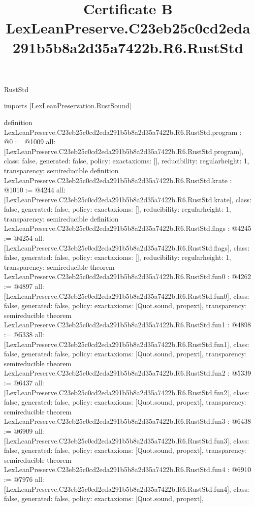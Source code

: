 \begin{lexlean}{RustStd}
\title{Certificate B LexLeanPreserve.C23eb25c0cd2eda291b5b8a2d35a7422b.R6.RustStd}
\begin{coremodule}
imports [LexLeanPreservation.RustSound]

definition LexLeanPreserve.C23eb25c0cd2eda291b5b8a2d35a7422b.R6.RustStd.program : @0 := @1009 {
  all: [LexLeanPreserve.C23eb25c0cd2eda291b5b8a2d35a7422b.R6.RustStd.program],
  class: false,
  generated: false,
  policy: exact{axioms: []},
  reducibility: regular{height: 1},
  transparency: semireducible
}
definition LexLeanPreserve.C23eb25c0cd2eda291b5b8a2d35a7422b.R6.RustStd.krate : @1010 := @4244 {
  all: [LexLeanPreserve.C23eb25c0cd2eda291b5b8a2d35a7422b.R6.RustStd.krate],
  class: false,
  generated: false,
  policy: exact{axioms: []},
  reducibility: regular{height: 1},
  transparency: semireducible
}
definition LexLeanPreserve.C23eb25c0cd2eda291b5b8a2d35a7422b.R6.RustStd.flags : @4245 := @4254 {
  all: [LexLeanPreserve.C23eb25c0cd2eda291b5b8a2d35a7422b.R6.RustStd.flags],
  class: false,
  generated: false,
  policy: exact{axioms: []},
  reducibility: regular{height: 1},
  transparency: semireducible
}
theorem LexLeanPreserve.C23eb25c0cd2eda291b5b8a2d35a7422b.R6.RustStd.fun0 : @4262 := @4897 {
  all: [LexLeanPreserve.C23eb25c0cd2eda291b5b8a2d35a7422b.R6.RustStd.fun0],
  class: false,
  generated: false,
  policy: exact{axioms: [Quot.sound, propext]},
  transparency: semireducible
}
theorem LexLeanPreserve.C23eb25c0cd2eda291b5b8a2d35a7422b.R6.RustStd.fun1 : @4898 := @5338 {
  all: [LexLeanPreserve.C23eb25c0cd2eda291b5b8a2d35a7422b.R6.RustStd.fun1],
  class: false,
  generated: false,
  policy: exact{axioms: [Quot.sound, propext]},
  transparency: semireducible
}
theorem LexLeanPreserve.C23eb25c0cd2eda291b5b8a2d35a7422b.R6.RustStd.fun2 : @5339 := @6437 {
  all: [LexLeanPreserve.C23eb25c0cd2eda291b5b8a2d35a7422b.R6.RustStd.fun2],
  class: false,
  generated: false,
  policy: exact{axioms: [Quot.sound, propext]},
  transparency: semireducible
}
theorem LexLeanPreserve.C23eb25c0cd2eda291b5b8a2d35a7422b.R6.RustStd.fun3 : @6438 := @6909 {
  all: [LexLeanPreserve.C23eb25c0cd2eda291b5b8a2d35a7422b.R6.RustStd.fun3],
  class: false,
  generated: false,
  policy: exact{axioms: [Quot.sound, propext]},
  transparency: semireducible
}
theorem LexLeanPreserve.C23eb25c0cd2eda291b5b8a2d35a7422b.R6.RustStd.fun4 : @6910 := @7976 {
  all: [LexLeanPreserve.C23eb25c0cd2eda291b5b8a2d35a7422b.R6.RustStd.fun4],
  class: false,
  generated: false,
  policy: exact{axioms: [Quot.sound, propext]},
}
\end{coremodule}
\end{lexlean}
